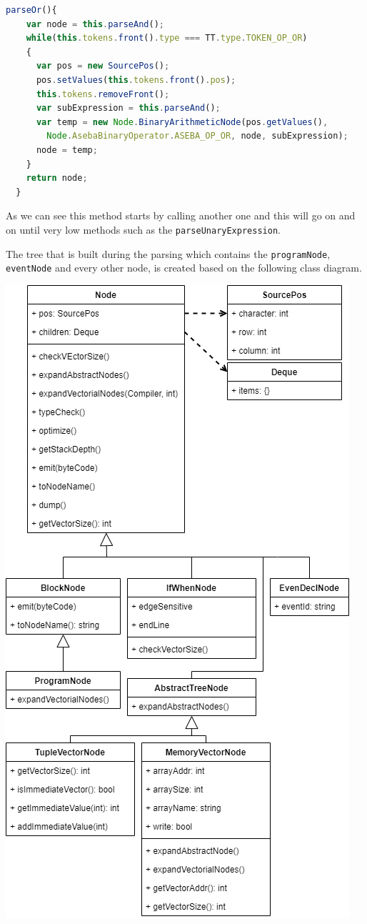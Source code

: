 \documentclass{scrbook}
\begin{document}
\begin{lstlisting}[language=JavaScript, gobble=2, basicstyle=\ttfamily\small]
  parseOr(){
    var node = this.parseAnd();
    while(this.tokens.front().type === TT.type.TOKEN_OP_OR)
    {
      var pos = new SourcePos();
      pos.setValues(this.tokens.front().pos);
      this.tokens.removeFront();
      var subExpression = this.parseAnd();
      var temp = new Node.BinaryArithmeticNode(pos.getValues(), 
        Node.AsebaBinaryOperator.ASEBA_OP_OR, node, subExpression);
      node = temp;
    }
    return node;
  }
\end{lstlisting}

As we can see this method starts by calling another one and this will go on and on until very low methods such as the \texttt{parseUnaryExpression}.

The tree that is built during the parsing which contains the \texttt{programNode}, \texttt{eventNode} and every other node, is created based on the following class diagram.

\begin{center}
  \includegraphics[scale=0.6]{./tree}
\end{center}
\end{document}
